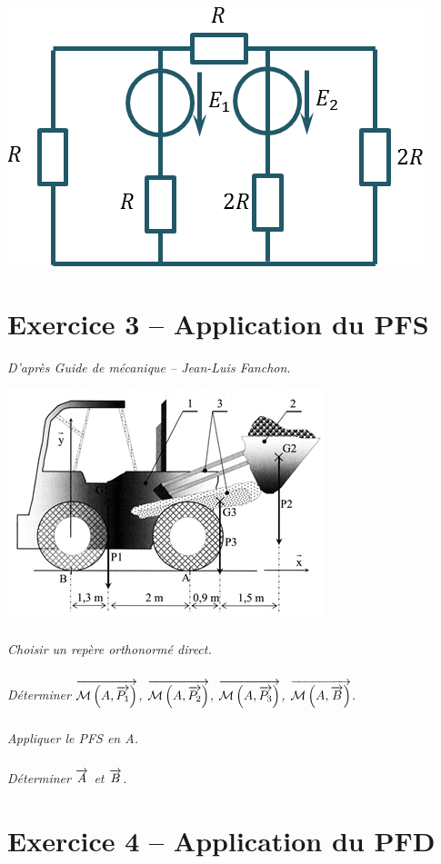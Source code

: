 \documentclass[10pt,fleqn]{book} %
\begin{document}
\begin{multicols}{2}
\begin{center}
\includegraphics[width=\linewidth]{images/fig_04}
\end{center}

\section*{Exercice 3 -- Application du PFS}
\setcounter{subparagraph}{0}

\textit{D'après Guide de mécanique -- Jean-Luis Fanchon.}

\begin{center}
\includegraphics[width=\linewidth]{images/fig_05}
\end{center}

\subparagraph{}
\textit{Choisir un repère orthonormé direct.}


\subparagraph{}
\textit{Déterminer $\overrightarrow{\mathcal{M}\left(A,\overrightarrow{P_1} \right)}$, $\overrightarrow{\mathcal{M}\left(A,\overrightarrow{P_2} \right)}$, 
$\overrightarrow{\mathcal{M}\left(A,\overrightarrow{P_3} \right)}$, $\overrightarrow{\mathcal{M}\left(A,\overrightarrow{B} \right)}$.}


\subparagraph{}
\textit{Appliquer le PFS en A.}

\subparagraph{}
\textit{Déterminer $\overrightarrow{A}$ et $\overrightarrow{B}$.}

\section*{Exercice 4 -- Application du PFD}
\end{multicols}
\end{document}
